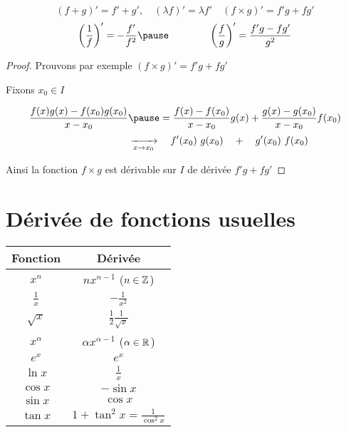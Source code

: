 \begin{frame}

$$(f+g)'=f'+g',\quad  (\lambda f)' = \lambda f' \quad (f \times g)' = f'g+fg' $$
\pause
$$\left(\frac{1}{f}\right)'=-\frac{f'}{f^2} \pause\qquad \qquad \left(\frac{f}{g}\right)'=\frac{f'g-fg'}{g^2}$$
\pause

\begin{proof}
Prouvons par exemple $(f \times g)' = f'g+fg'$

\pause 

Fixons $x_0 \in I$

\pause 

$$\frac{f(x)g(x)-f(x_0)g(x_0)}{x-x_0} 
\pause 
=\frac{f(x)-f(x_0)}{x-x_0} g(x)+\frac{g(x)-g(x_0)}{x-x_0}f(x_0)$$
\pause
$$\hspace*{7em} \xrightarrow[x\to x_0]{} \quad  f'(x_0) \  g(x_0) \quad + \quad g'(x_0) \ f(x_0)$$

\pause 

Ainsi la fonction $f\times g$ est dérivable sur $I$ de dérivée $f'g+fg'$
\end{proof}

\end{frame}




\section*{Dérivée de fonctions usuelles}


\begin{frame}
\begin{center}
\setlength{\arrayrulewidth}{0.05mm}
\begin{tabular}[t]{cc@{\vrule depth 1.2ex height 3ex width 0mm \ }} 
\textbf{Fonction}         & \textbf{Dérivée} \\ \hline
   $x^n$         & $nx^{n-1}$  \quad ($n \in \mathbb{Z}$)   \\ \hline
   $\frac 1x$    & $-\frac{1}{x^2}$              \\ \hline
   $\sqrt{x}$    & $\frac12 \frac1{\sqrt{x}}$   \\ \hline
   $x^\alpha$   & $\alpha x^{\alpha-1}$  \quad ($\alpha\in\mathbb{R}$)  \\ \hline
   $e^x$         & $e^x$                        \\ \hline
   $\ln x$       & $\frac 1x$                   \\ \hline
   $\cos x$      & $-\sin x$                    \\ \hline
   $\sin x$      & $\cos x$                     \\ \hline
   $\tan x$      & $1+\tan^2 x = \frac{1}{\cos^2 x}$        \\ \hline
\end{tabular} 
\end{center}
\end{frame}



